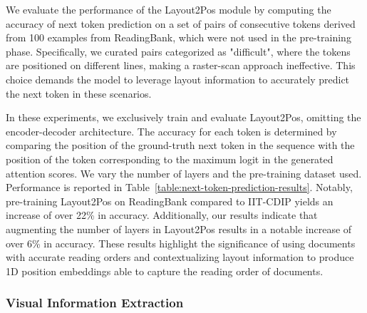 We evaluate the performance of the Layout2Pos module by computing the accuracy of next token prediction on a set of pairs of consecutive tokens derived from 100 examples from ReadingBank, which were not used in the pre-training phase. Specifically, we curated pairs categorized as "difficult", where the tokens are positioned on different lines, making a raster-scan approach ineffective. This choice demands the model to leverage layout information to accurately predict the next token in these scenarios.

In these experiments, we exclusively train and evaluate Layout2Pos, omitting the encoder-decoder architecture. The accuracy for each token is determined by comparing the position of the ground-truth next token in the sequence with the position of the token corresponding to the maximum logit in the generated attention scores. We vary the number of layers and the pre-training dataset used. Performance is reported in Table~\ref{table:next-token-prediction-results}. Notably, pre-training Layout2Pos on ReadingBank compared to IIT-CDIP yields an increase of over 22\% in accuracy. Additionally, our results indicate that augmenting the number of layers in Layout2Pos results in a notable increase of over 6\% in accuracy. These results highlight the significance of using documents with accurate reading orders and contextualizing layout information to produce 1D position embeddings able to capture the reading order of documents.

\subsubsection{Visual Information Extraction}

